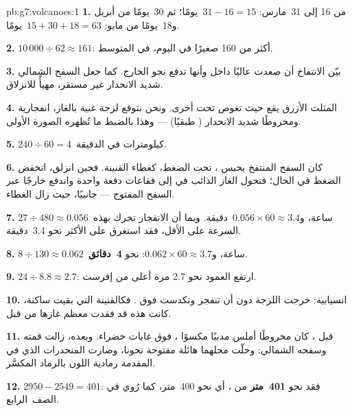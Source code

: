 \begin{solution}{pb:g7:volcanoes:1}
\textbf{1.} من 16 إلى 31~مارس: $31 - 16 = 15$~يومًا؛ ثم 30~يومًا من
أبريل و18~يومًا من مايو: $15 + 30 + 18 = 63$~يومًا.

\textbf{2.} $10\,000 \div 62 \approx 161$: أكثر من 160  صغيرًا
في اليوم، في المتوسط.

\textbf{3.} بيّن الانتفاخ أن  صعدت عاليًا داخل
 وأنها تدفع  نحو الخارج. كما جعل السفح الشمالي
شديد الانحدار غير مستقر، مهيأً للانزلاق.

\textbf{4.} المثلث الأزرق يقع حيث تغوص  تحت أخرى. ونحن
نتوقع  لزجة غنية بالغاز،  انفجارية ومخروطًا شديد الانحدار (
طبقيًا) --- وهذا بالضبط ما تُظهره الصورة الأولى.

\textbf{5.} $240 \div 60 = 4$~كيلومترات في الدقيقة.

\textbf{6.} كان السفح المنتفخ يحبس ، تحت الضغط،
كغطاء القنينة. فحين انزلق، انخفض الضغط في
الحال؛ فتحول الغاز الذائب في  إلى فقاعات دفعة واحدة
واندفع خارجًا عبر السفح المفتوح --- جانبيًا، حيث زال الغطاء.

\textbf{7.} $27 \div 480 \approx 0.056$~ساعة، و$0.056 \times 60 \approx
3.4$~دقيقة. وبما أن الانفجار تحرك بهذه السرعة على الأقل، فقد استغرق على الأكثر
نحو 3.4~دقيقة.

\textbf{8.} $8 \div 130 \approx 0.062$~ساعة، و$0.062 \times 60 \approx
3.7$: نحو \textbf{4~دقائق}.

\textbf{9.} $24 \div 8.8 \approx 2.7$: ارتفع العمود نحو 2.7 مرة
أعلى من  إفرست.

\textbf{10.} انسيابية: خرجت  اللزجة دون أن تنفجر وتكدست
فوق . فكالقنينة التي بقيت ساكنة، كانت هذه  قد
فقدت معظم غازها من قبل.

\textbf{11.} قبل ، كان  مخروطًا أملس مدببًا مكسوًا
، فوق غابات خضراء. وبعده، زالت قمته وسفحه الشمالي: وحلّت محلهما
 هائلة مفتوحة نحونا، وصارت المنحدرات 
الذي في المقدمة رمادية اللون بالرماد  المكسَّر.

\textbf{12.} $2950 - 2549 = 401$: فقد  نحو
\textbf{401~متر} من ، أي نحو 400~متر، كما رُوي في الصف~الرابع.
\end{solution}
